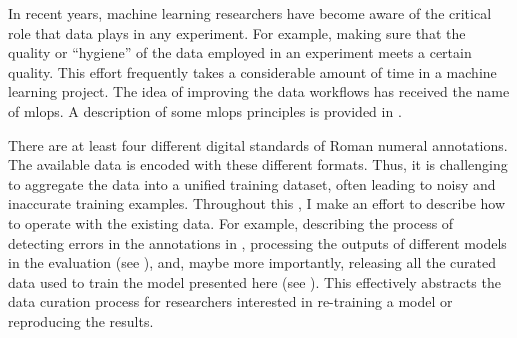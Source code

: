 

In recent years, machine learning researchers have become
aware of the critical role that data plays in any
experiment. For example, making sure that the quality or
``hygiene'' of the data employed in an experiment meets a
certain quality. This effort frequently takes a considerable
amount of time in a machine learning project. The idea of
improving the data workflows has received the name of
\gls{mlops}. A description of some \gls{mlops} principles is
provided in \textcite{renggli2021data}.

There are at least four different digital standards of Roman
numeral annotations. The available data is encoded with
these different formats. Thus, it is challenging to
aggregate the data into a unified training dataset, often
leading to noisy and inaccurate training examples.
Throughout this \thesisdiss{}, I make an effort to describe
how to operate with the existing data. For example,
describing the process of detecting errors in the
annotations in ,
processing the outputs of different models in the evaluation
(see ), and, maybe more
importantly, releasing all the curated data used to train
the model presented here (see ).
This effectively abstracts the data curation process for
researchers interested in re-training a model or reproducing
the results.